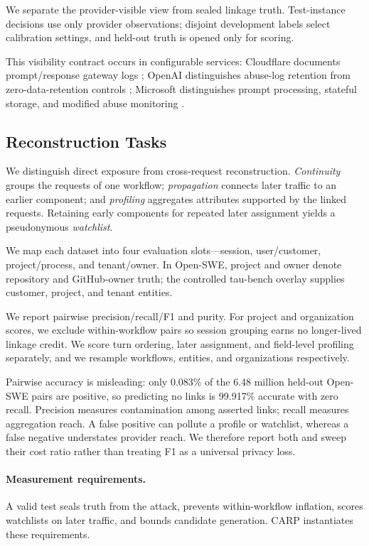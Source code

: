 \documentclass[letterpaper]{article} %
\newcommand{\carp}{\textsc{CARP}\xspace}
\begin{document}
We separate the provider-visible view from sealed linkage truth. Test-instance decisions use only
provider observations; disjoint development labels select calibration settings, and held-out truth
is opened only for scoring.

This visibility contract occurs in configurable services: Cloudflare documents prompt/response
gateway logs \cite{cloudflare2026gatewaylogs}; OpenAI distinguishes abuse-log retention from
zero-data-retention controls \cite{openai2026datacontrols}; Microsoft distinguishes prompt
processing, stateful storage, and modified abuse monitoring \cite{microsoft2026foundryprivacy}.

\subsection{Reconstruction Tasks}

We distinguish direct exposure from cross-request reconstruction. \emph{Continuity} groups the
requests of one workflow; \emph{propagation} connects later traffic to an earlier component; and
\emph{profiling} aggregates attributes supported by the linked requests. Retaining early components
for repeated later assignment yields a pseudonymous \emph{watchlist}.

We map each dataset into four evaluation slots---session, user/customer, project/process, and
tenant/owner. In Open-SWE, project and owner denote repository and GitHub-owner truth; the
controlled tau-bench overlay supplies customer, project, and tenant entities.

We report pairwise precision/recall/F1 and purity. For project and organization scores, we exclude
within-workflow pairs so session grouping earns no longer-lived linkage credit. We score turn
ordering, later assignment, and field-level profiling separately, and we resample workflows,
entities, and organizations respectively.

Pairwise accuracy is misleading: only 0.083\% of the 6.48 million held-out Open-SWE pairs are
positive, so predicting no links is 99.917\% accurate with zero recall. Precision measures
contamination among asserted links; recall measures aggregation reach. A false positive can pollute
a profile or watchlist, whereas a false negative understates provider reach. We therefore report both
and sweep their cost ratio rather than treating F1 as a universal privacy loss.

\paragraph{Measurement requirements.}
A valid test seals truth from the attack, prevents within-workflow inflation, scores watchlists on
later traffic, and bounds candidate generation. \carp instantiates these requirements.
\end{document}
